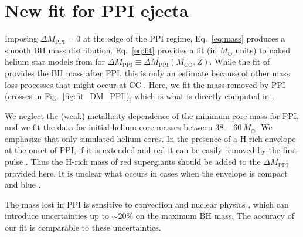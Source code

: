 \documentclass[twocolumn]{aastex63}
\DeclareRobustCommand{\Eqref}[1]{Eq.~\ref{#1}}
\DeclareRobustCommand{\Figref}[1]{Fig.~\ref{#1}}
\begin{document}
\section{New fit for PPI ejecta}


Imposing $\Delta M_\mathrm{PPI}=0$ at the edge of the PPI regime,
\Eqref{eq:mass} produces a smooth BH mass distribution.
\Eqref{eq:fit} provides a fit (in $M_\odot$ units) to naked helium
star models from \cite{farmer:19} for
$\Delta M_\mathrm{PPI} \equiv \Delta M_\mathrm{PPI}(M_\mathrm{CO},Z)$.
While the fit of \cite{farmer:19} provides the BH mass after PPI, this
is only an estimate because of other mass loss processes that might
occur at CC \citep[e.g.,][]{renzo:20csm, powell:21, rahman:22}. Here,
we fit the mass removed by PPI (crosses in \Figref{fig:fit_DM_PPI}),
which is what is directly computed in \cite{farmer:19}.

We neglect the (weak) metallicity dependence of the minimum core mass
for PPI, and we fit the data for initial helium core masses between
$38-60\,M_\odot$.  We emphasize that \cite{farmer:19} only simulated
helium cores. In the presence of a H-rich envelope at the onset of
PPI, if it is extended and red it can be easily removed by the first
pulse \citep[][]{woosley:17,renzo:20csm}. Thus the H-rich mass of red
supergiants should be added to the $\Delta M_\mathrm{PPI}$ provided
here. It is unclear what occurs in cases when the envelope is compact
and blue \citep[e.g.,][]{dicarlo:19, renzo:20merger, costa:21}.


The mass lost in PPI is sensitive to convection
\citep{renzo:20conv} and nuclear physics \citep{farmer:19,
  farmer:20, costa:21, woosley:21, mehta:21}, which can introduce
uncertainties up to $\sim{}20\%$ on the maximum BH mass. The accuracy
of our fit is comparable to these uncertainties.

\vspace*{-10pt}



\newpage

\end{document}
